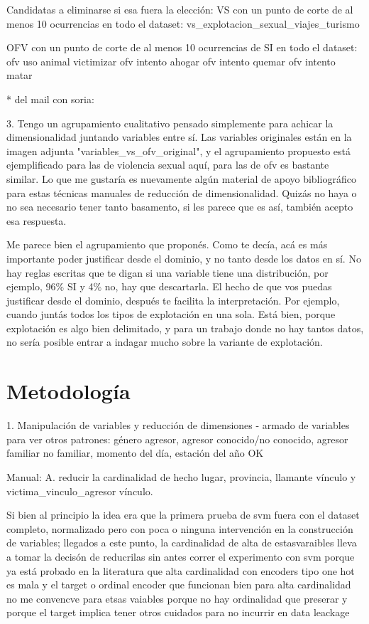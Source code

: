 \documentclass[10pt, spanish]{article}
\begin{document}
Candidatas a eliminarse si esa fuera la elección: VS con un punto de corte de al menos 10 ocurrencias en todo el dataset: vs\_explotacion\_sexual\_viajes\_turismo



OFV con un punto de corte de al menos 10 ocurrencias de SI en todo el dataset: ofv uso animal victimizar
ofv intento ahogar
ofv intento quemar 
ofv intento matar


* del mail con soria:

3. Tengo un agrupamiento cualitativo pensado simplemente para achicar la dimensionalidad juntando variables entre sí. Las variables originales están en la imagen adjunta "variables\_vs\_ofv\_original", y el agrupamiento propuesto está ejemplificado para las de violencia sexual aquí, para las de ofv es bastante similar. Lo que me gustaría es nuevamente algún material de apoyo bibliográfico para estas técnicas manuales de reducción de dimensionalidad. Quizás no haya o no sea necesario tener tanto basamento, si les parece que es así, también acepto esa respuesta.

Me parece bien el agrupamiento que proponés. Como te decía, acá es más importante poder justificar desde el dominio, y no tanto desde los datos en sí. No hay reglas escritas que te digan si una variable tiene una distribución, por ejemplo, 96\% SI y 4\% no, hay que descartarla.
El hecho de que vos puedas justificar desde el dominio, después te facilita la interpretación. Por ejemplo, cuando juntás todos los tipos de explotación en una sola. Está bien, porque explotación es algo bien delimitado, y para un trabajo donde no hay tantos datos, no sería posible entrar a indagar mucho sobre la variante de explotación.



\section{Metodología}\label{met}


1. Manipulación de variables y reducción de dimensiones
- armado de variables para ver otros patrones: género agresor, agresor conocido/no conocido, agresor familiar no familiar, momento del día, estación del año OK

Manual:
A. reducir la cardinalidad de hecho lugar, provincia, llamante vínculo y victima_vinculo_agresor vínculo. 

Si bien al principio la idea era que la primera prueba de svm fuera con el dataset completo, normalizado pero con poca o ninguna intervención en la construcción de variables; llegados a este punto, la cardinalidad de alta de estasvaraibles lleva a tomar la decisón de reducrilas sin antes correr el experimento con svm porque ya está probado en la literatura que alta cardinalidad con encoders tipo one hot es mala y el target o ordinal encoder que funcionan bien para alta cardinalidad no me convencve para etsas vaiables porque no hay ordinalidad que preserar y porque el target implica tener otros cuidados para no incurrir en data leackage
\end{document}
